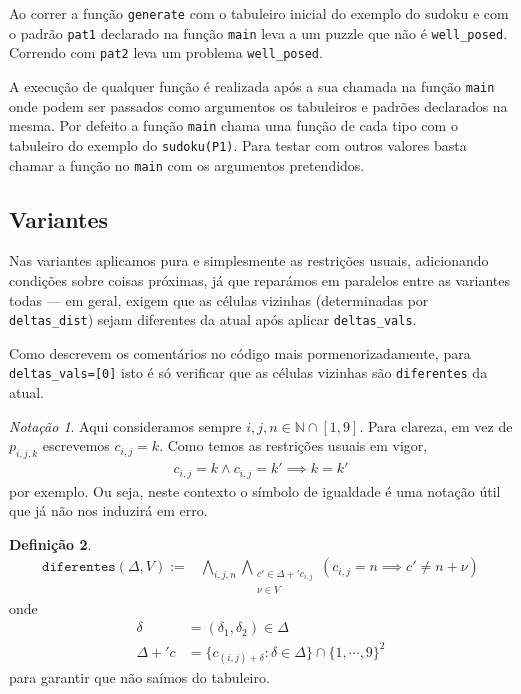 \documentclass[a4paper,12pt]{article}
\theoremstyle{definition}
\newtheorem{defn}{Definição}[section]
\theoremstyle{theorem}
\theoremstyle{remark}
\newtheorem{notç}[defn]{Notação}
\newcommand{\code}[1]{\texttt{#1}}
\begin{document}
Ao correr a função \code{generate} com o tabuleiro inicial do exemplo do
sudoku e com o padrão \code{pat1} declarado na função \code{main} leva a um
puzzle que não é \code{well\_posed}. Correndo com \code{pat2} leva um problema
\code{well\_posed}.

A execução de qualquer função é realizada após a sua chamada na função
\code{main} onde podem ser passados como argumentos os tabuleiros e padrões
declarados na mesma. Por defeito a função \code{main} chama uma função de cada
tipo com o tabuleiro do exemplo do \code{sudoku(P1)}. Para testar com outros
valores basta chamar a função no \code{main} com os argumentos pretendidos.






\subsection{Variantes}
Nas variantes aplicamos pura e simplesmente as restrições usuais,
adicionando condições sobre coisas próximas, já que reparámos em
paralelos entre as variantes todas \---- em geral, exigem que
as células vizinhas (determinadas por \code{deltas\_dist})
sejam diferentes da atual após aplicar \code{deltas\_vals}.

Como
descrevem os comentários no código mais pormenorizadamente, para
\code{deltas\_vals=[0]} isto é só verificar que as células vizinhas
são \code{diferentes} da atual.

\begin{notç}
   Aqui consideramos sempre $i,j,n\in\mathbb N\cap[1,9]$.
   Para clareza, em vez de $p_{i,j,k}$ escrevemos $c_{i,j}=k$. Como temos
   as restrições usuais em vigor,
   \begin{align}
      c_{i,j}=k\land c_{i,j}=k' \implies k = k'
   \end{align}
   por exemplo. Ou seja, neste contexto o símbolo de igualdade é uma notação
   útil que já não nos
   induzirá em erro.
\end{notç}

\begin{defn}
\begin{align}
   \mathtt{diferentes}(\Delta, V) :=%
   &\bigwedge_{i,j,n}
   \bigwedge_{\substack{c'\in\Delta+'c_{i,j}\\\nu\in V}}
   (c_{i,j} = n
      \implies
   c' \neq n + \nu)
\end{align}
onde
\begin{align}
   \delta &= (\delta_1,\delta_2)\in \Delta\\
   \Delta+'c &= \{c_{(i,j)+\delta}:\delta\in\Delta\}\cap\{1,\cdots,9\}^2
\end{align}
para garantir que não saímos do tabuleiro.
\end{defn}
\end{document}
